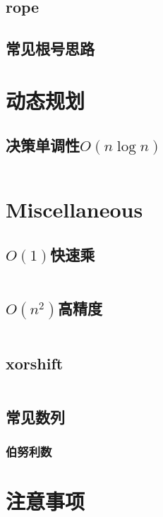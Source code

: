 \documentclass[a4paper]{article}
\begin{document}
\begin{multicols}{2}
				\subsection{rope}


				\subsection{常见根号思路}


			\section{动态规划}
				\subsection{决策单调性$O(n\log n)$}
					\inputminted{cpp}{../src/DP/决策单调性.cpp}

			\section{Miscellaneous}
				\subsection{$O(1)$快速乘}
					\inputminted{cpp}{../src/misc/O(1)快速乘.cpp}
				
				\subsection{$O(n^2)$高精度}
					\inputminted{cpp}{../src/misc/高精度.cpp}

				\subsection{xorshift}
					\inputminted{cpp}{../src/misc/xorshift.cpp}
					
				\subsection{常见数列}
					\subsubsection{伯努利数}
						

			\section{注意事项}

\end{multicols}
\end{document}
